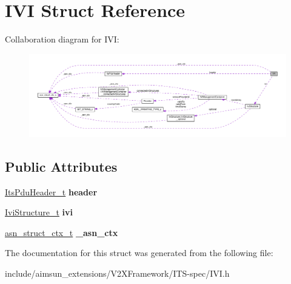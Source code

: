 \hypertarget{structIVI}{}\section{I\+VI Struct Reference}
\label{structIVI}


Collaboration diagram for I\+VI\+:\nopagebreak
\begin{figure}[H]
\begin{center}
\leavevmode
\includegraphics[width=350pt]{structIVI__coll__graph}
\end{center}
\end{figure}
\subsection*{Public Attributes}
\begin{DoxyCompactItemize}
\item 
\hyperlink{structItsPduHeader}{Its\+Pdu\+Header\+\_\+t} {\bfseries header}\hypertarget{structIVI_affad3892aad8f169fa117eef446e665d}{}\label{structIVI_affad3892aad8f169fa117eef446e665d}

\item 
\hyperlink{structIviStructure}{Ivi\+Structure\+\_\+t} {\bfseries ivi}\hypertarget{structIVI_acbefa9676debf41feb4d69be53fce7a0}{}\label{structIVI_acbefa9676debf41feb4d69be53fce7a0}

\item 
\hyperlink{structasn__struct__ctx__s}{asn\+\_\+struct\+\_\+ctx\+\_\+t} {\bfseries \+\_\+asn\+\_\+ctx}\hypertarget{structIVI_ac54ec80522507f242f89428fa8d82a2a}{}\label{structIVI_ac54ec80522507f242f89428fa8d82a2a}

\end{DoxyCompactItemize}


The documentation for this struct was generated from the following file\+:\begin{DoxyCompactItemize}
\item 
include/aimsun\+\_\+extensions/\+V2\+X\+Framework/\+I\+T\+S-\/spec/I\+V\+I.\+h\end{DoxyCompactItemize}

